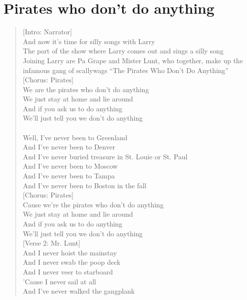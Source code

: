 \documentclass[11pt]{article}
\begin{document}
\section{Pirates who don't do anything}
\label{sec:org16bef59}
\begin{verse}
[Intro: Narrator]\\
And now it's time for silly songs with Larry\\
The part of the show where Larry comes out and sings a silly song\\
\vspace*{1em}
Joining Larry are Pa Grape and Mister Lunt, who together, make up the infamous gang of scallywags ``The Pirates Who Don't Do Anything''\\
\vspace*{1em}
[Chorus: Pirates]\\
We are the pirates who don't do anything\\
We just stay at home and lie around\\
And if you ask us to do anything\\
We'll just tell you we don't do anything\\
[Verse 1: Pa Grape]\\
Well, I've never been to Greenland\\
And I've never been to Denver\\
And I've never buried treasure in St. Louie or St. Paul\\
And I've never been to Moscow\\
And I've never been to Tampa\\
And I've never been to Boston in the fall\\
\vspace*{1em}
[Chorus: Pirates]\\
Cause we're the pirates who don't do anything\\
We just stay at home and lie around\\
And if you ask us to do anything\\
We'll just tell you we don't do anything\\
\vspace*{1em}
[Verse 2: Mr. Lunt]\\
And I never hoist the mainstay\\
And I never swab the poop deck\\
And I never veer to starboard\\
'Cause I never sail at all\\
And I've never walked the gangplank\\

\end{verse}
\end{document}
